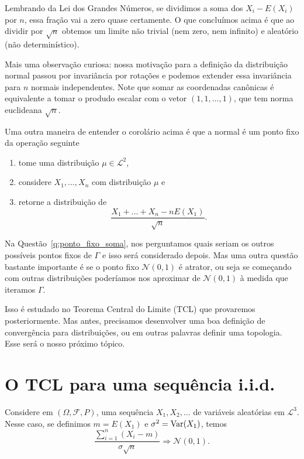 Lembrando da Lei dos Grandes Números, se dividimos a soma dos $X_i - E(X_i)$ por $n$, essa fração vai a zero quase certamente.
O que concluímos acima é que ao dividir por $\sqrt{n}$ obtemos um limite não trivial (nem zero, nem infinito) e aleatório (não determinístico).

Mais uma observação curiosa: nossa motivação para a definição da distribuição normal passou por invariância por rotações e podemos extender essa invariância para $n$ normais independentes.
Note que somar as coordenadas canônicas é equivalente a tomar o produdo escalar com o vetor $(1,1,\dots,1)$, que tem norma euclideana $\sqrt{n}$.

Uma outra maneira de entender o corolário acima é que a normal é um ponto fixo da operação seguinte
\begin{enumerate}[\quad a)]
\item tome uma distribuição $\mu \in \mathcal{L}^2$,
\item considere $X_1, \dots, X_n$ \iid com distribuição $\mu$ e
\item retorne a distribuição de
  \begin{equation}
    \frac{X_1 + \dots + X_n - n E(X_1)}{\sqrt{n}}.
  \end{equation}
\end{enumerate}

Na Questão~\ref{q:ponto_fixo_soma}, nos perguntamos quais seriam os outros possíveis pontos fixos de $\Gamma$ e isso será considerado depois.
Mas uma outra questão bastante importante é se o ponto fixo $\mathcal{N}(0,1)$ é atrator, ou seja se começando com outras distribuições poderíamos nos aproximar de $\mathcal{N}(0,1)$ à medida que iteramos $\Gamma$.

Isso é estudado no Teorema Central do Limite (TCL) que provaremos posteriormente.
Mas antes, precisamos desenvolver uma boa definição de convergência para distribuições, ou em outras palavras definir uma topologia.
Esse será o nosso próximo tópico.

\section{O TCL para uma sequência i.i.d.}

\begin{theorem}
  \label{t:tcl_iid}
  Considere em $(\Omega, \mathcal{F}, P)$, uma sequência $X_1, X_2, \dots$ de variáveis aleatórias \iid em $\mathcal{L}^3$.
  Nesse caso, se definimos $m = E(X_1)$ e $\sigma^2 = \operatorname{Var}(X_1)$, temos
  \begin{equation}
    \frac{\sum_{i=1}^n (X_i - m)}{\sigma \sqrt{n}} \Rightarrow \mathcal{N}(0,1).
  \end{equation}
\end{theorem}

